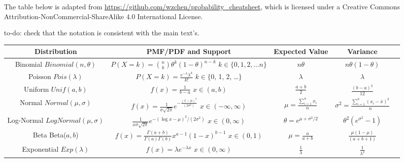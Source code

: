 \documentclass[12pt,]{krantz}
\begin{document}
The table below is adapted from \url{https://github.com/wzchen/probability_cheatsheet}, which is licensed under a Creative Commons Attribution-NonCommercial-ShareAlike 4.0 International License.

to-do: check that the notation is consistent with the main text's.

\small
\begin{center}
\renewcommand{\arraystretch}{3.7}
\begin{tabular}{ccccc}
\textbf{Distribution} & \textbf{PMF/PDF and Support} & \textbf{Expected Value}  & \textbf{Variance}\\
\hline 
\shortstack{Binomial \\ $Binomial(n, \theta)$} & \shortstack{$P(X=k) = \binom{n}{k}\theta^k (1-\theta)^{n-k}$  \\ $k \in \{0, 1, 2, \dots n\}$}& $n\theta$ & $n\theta(1-\theta)$ \\
\hline
\shortstack{Poisson \\ $Pois(\lambda)$} & \shortstack{$P(X=k) = \frac{e^{-\lambda}\lambda^k}{k!}$ \\ $k \in \{$0, 1, 2, \dots $\}$} & $\lambda$ & $\lambda$ \\
\hline
\shortstack{Uniform \\ $Unif(a, b)$} & \shortstack{$ f(x) = \frac{1}{b-a}$ \\$ x \in (a, b) $} & $\frac{a+b}{2}$ & $\frac{(b-a)^2}{12}$ \\
\hline
\shortstack{Normal \\ $Normal(\mu, \sigma)$} & \shortstack{$f(x) = \frac{1}{\sigma \sqrt{2\pi}} e^{-\frac{(x - \mu)^2}{(2 \sigma^2)}}$ \\ $x \in (-\infty, \infty)$} & $\mu =  \frac{\sum_{i=1}^n x_i}{n}$ & $\sigma^2 = \frac{\sum_{i=1}^n (x_i-\bar{x})^2}{n}$ \\
\hline
\shortstack{Log-Normal \\ $LogNormal(\mu,\sigma)$} & \shortstack{$\frac{1}{x\sigma \sqrt{2\pi}}e^{-(\log x - \mu)^2/(2\sigma^2)}$\\$x \in (0, \infty)$} & $\theta = e^{ \mu + \sigma^2/2}$ & $\theta^2 (e^{\sigma^2} - 1)$ \\
\hline
\shortstack{Beta \\ Beta($a, b$)} & \shortstack{$f(x) = \frac{\Gamma(a+b)}{\Gamma(a)\Gamma(b)}x^{a-1}(1-x)^{b-1}$\\$x \in (0, 1) $} & $\mu = \frac{a}{a + b}$  & $\frac{\mu(1-\mu)}{(a + b + 1)}$  \\
\hline
\shortstack{Exponential \\ $Exp(\lambda)$} & \shortstack{$f(x) = \lambda e^{-\lambda x}$\\$ x \in (0, \infty)$} & $\frac{1}{\lambda}$  & $\frac{1}{\lambda^2}$ \\

\end{tabular}
\end{center}
\end{document}
